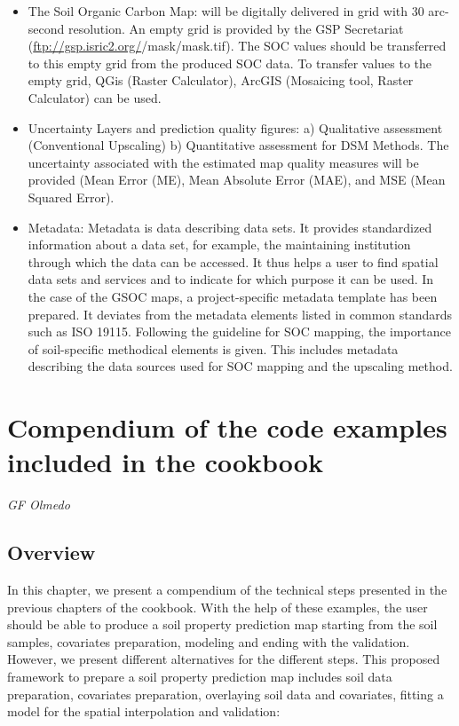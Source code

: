\documentclass[10pt,b5paper,]{book}
\providecommand{\tightlist}{%
  \setlength{\itemsep}{0pt}\setlength{\parskip}{0pt}}
\theoremstyle{definition}
\theoremstyle{definition}
\theoremstyle{definition}
\theoremstyle{remark}
\begin{document}
\begin{itemize}
\tightlist
\item
  The Soil Organic Carbon Map: will be digitally delivered in grid with
  30 arc-second resolution. An empty grid is provided by the GSP
  Secretariat (\url{ftp://gsp.isric2.org/}/mask/mask.tif). The SOC
  values should be transferred to this empty grid from the produced SOC
  data. To transfer values to the empty grid, QGis (Raster Calculator),
  ArcGIS (Mosaicing tool, Raster Calculator) can be used.
\item
  Uncertainty Layers and prediction quality figures: a) Qualitative
  assessment (Conventional Upscaling) b) Quantitative assessment for DSM
  Methods. The uncertainty associated with the estimated map quality
  measures will be provided (Mean Error (ME), Mean Absolute Error (MAE),
  and MSE (Mean Squared Error).
\item
  Metadata: Metadata is data describing data sets. It provides
  standardized information about a data set, for example, the
  maintaining institution through which the data can be accessed. It
  thus helps a user to find spatial data sets and services and to
  indicate for which purpose it can be used. In the case of the GSOC
  maps, a project-specific metadata template has been prepared. It
  deviates from the metadata elements listed in common standards such as
  ISO 19115. Following the guideline for SOC mapping, the importance of
  soil-specific methodical elements is given. This includes metadata
  describing the data sources used for SOC mapping and the upscaling
  method.
\end{itemize}

\hypertarget{compendium-of-the-code-examples-included-in-the-cookbook}{%
\chapter{Compendium of the code examples included in the
cookbook}\label{compendium-of-the-code-examples-included-in-the-cookbook}}

\emph{GF Olmedo}

\hypertarget{overview-4}{%
\section{Overview}\label{overview-4}}

In this chapter, we present a compendium of the technical steps
presented in the previous chapters of the cookbook. With the help of
these examples, the user should be able to produce a soil property
prediction map starting from the soil samples, covariates preparation,
modeling and ending with the validation. However, we present different
alternatives for the different steps. This proposed framework to prepare
a soil property prediction map includes soil data preparation,
covariates preparation, overlaying soil data and covariates, fitting a
model for the spatial interpolation and validation:
\end{document}
